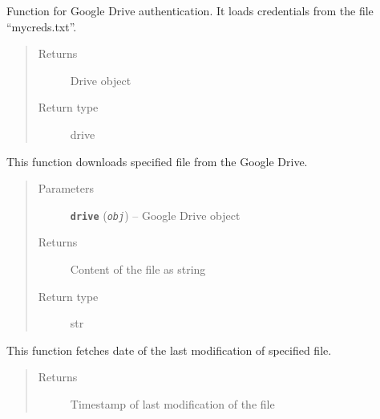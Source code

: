 \documentclass[letterpaper,10pt,english,openany]{sphinxmanual}
\begin{document}
\begin{fulllineitems}
\begin{fulllineitems}
\label{index:rpicameramon.filemanipulation.ConfFileDownloader.auth}
Function for Google Drive authentication. It loads credentials from the
file ``mycreds.txt''.
\begin{quote}\begin{description}
\item[{Returns}] \leavevmode
Drive object

\item[{Return type}] \leavevmode
drive

\end{description}\end{quote}

\end{fulllineitems}


\begin{fulllineitems}
\label{index:rpicameramon.filemanipulation.ConfFileDownloader.download_file}
This function downloads specified file from the Google Drive.
\begin{quote}\begin{description}
\item[{Parameters}] \leavevmode
\textbf{\texttt{drive}} (\emph{\texttt{obj}}) -- Google Drive object

\item[{Returns}] \leavevmode
Content of the file as string

\item[{Return type}] \leavevmode
str

\end{description}\end{quote}

\end{fulllineitems}


\begin{fulllineitems}
\label{index:rpicameramon.filemanipulation.ConfFileDownloader.get_timestamp}
This function fetches date of the last modification of specified file.
\begin{quote}\begin{description}
\item[{Returns}] \leavevmode
Timestamp of last modification of the file


\end{description}
\end{quote}
\end{fulllineitems}
\end{fulllineitems}
\end{document}
